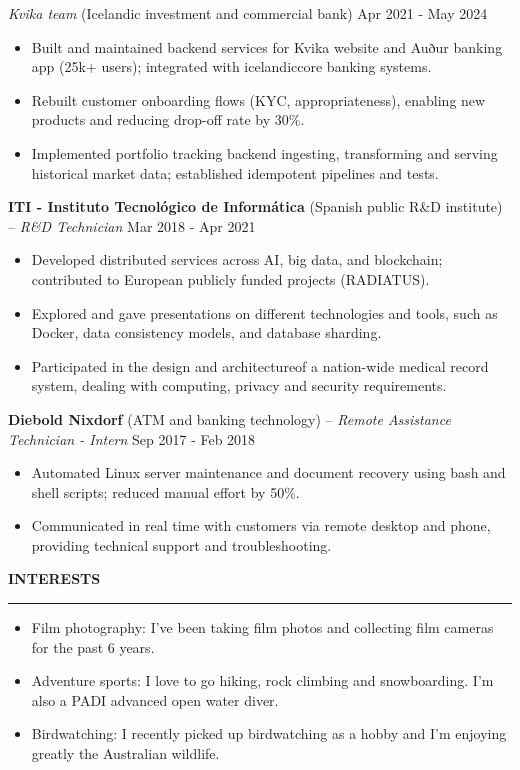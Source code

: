 \documentclass[10pt,a4paper,ragged2e]{altacv}
\renewcommand{\cvsection}[2][]{%
  \bigskip%
  {\color{heading}\large\bfseries\MakeUppercase{#2}}\\[-1ex]%
  {\color{heading}\rule{\linewidth}{0.5pt}\par}\medskip
}
\newcommand{\cvjob}[4]{%
  \textbf{#1} {\small(#4)} -- \textit{#2} \hfill {\small #3}\par\smallskip
}
\newcommand{\cvsubentry}[3]{%
  \hspace{0.5em}\textit{#1} {\small(#2)} \hfill {\small #3}\par\smallskip
}
\begin{document}
\cvsubentry{Kvika team}{Icelandic investment and commercial bank}{Apr 2021 - May 2024}
{\small
\begin{itemize}[nosep,topsep=0pt,parsep=0pt,partopsep=0pt,leftmargin=*]
\item Built and maintained backend services for Kvika website and Auður banking app (25k+ users); integrated with icelandiccore banking systems.
\item Rebuilt customer onboarding flows (KYC, appropriateness), enabling new products and reducing drop-off rate by 30\%.
\item Implemented portfolio tracking backend ingesting, transforming and serving historical market data; established idempotent pipelines and tests.
\end{itemize}
}\medskip

\cvjob{ITI - Instituto Tecnológico de Informática}{R\&D Technician}{Mar 2018 - Apr 2021}{Spanish public R\&D institute}
{\small
\begin{itemize}[nosep,topsep=0pt,parsep=0pt,partopsep=0pt,leftmargin=*]
\item Developed distributed services across AI, big data, and blockchain; contributed to European publicly funded projects (RADIATUS).
\item Explored and gave presentations on different technologies and tools, such as Docker, data consistency models, and database sharding.
\item Participated in the design and architectureof a nation-wide medical record system, dealing with computing, privacy and security requirements.
\end{itemize}
}\medskip

\cvjob{Diebold Nixdorf}{Remote Assistance Technician - Intern}{Sep 2017 - Feb 2018}{ATM and banking technology}
{\small
\begin{itemize}[nosep,topsep=0pt,parsep=0pt,partopsep=0pt,leftmargin=*]
\item Automated Linux server maintenance and document recovery using bash and shell scripts; reduced manual effort by 50\%.
\item Communicated in real time with customers via remote desktop and phone, providing technical support and troubleshooting.
\end{itemize}
}

\cvsection{Interests}
{\small 
\begin{itemize}[nosep,topsep=0pt,parsep=0pt,partopsep=0pt,leftmargin=*]
\item Film photography: I've been taking film photos and collecting film cameras for the past 6 years.
\item Adventure sports: I love to go hiking, rock climbing and snowboarding. I'm also a PADI advanced open water diver.
\item Birdwatching: I recently picked up birdwatching as a hobby and I'm enjoying greatly the Australian wildlife.
\end{itemize}
}
\end{document}
